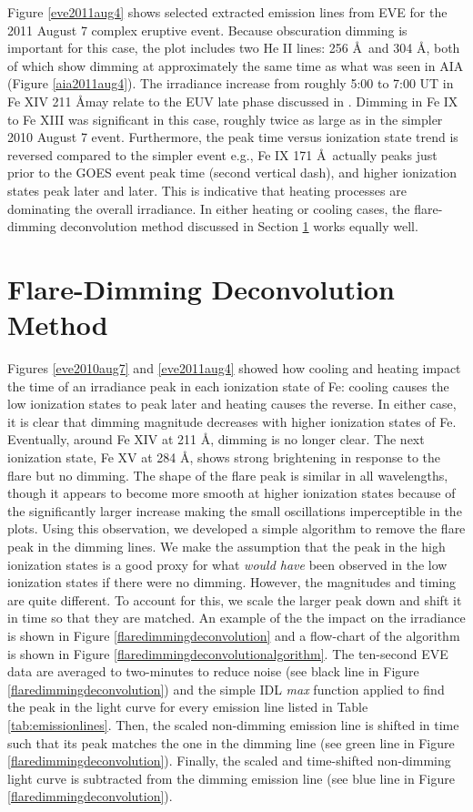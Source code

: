 Figure \ref{eve2011aug4} shows selected extracted emission lines from EVE for the 2011 August 7 complex eruptive event. Because obscuration dimming is important for this case, the plot includes two He II lines: 256 \AA\ and 304 \AA, both of which show dimming at approximately the same time as what was seen in AIA (Figure \ref{aia2011aug4}). The irradiance increase from roughly 5:00 to 7:00 UT in Fe XIV 211 \AA may relate to the EUV late phase discussed in \citet{Woods2011}. Dimming in Fe IX to Fe XIII was significant in this case, roughly twice as large as in the simpler 2010 August 7 event. Furthermore, the peak time versus ionization state trend is reversed compared to the simpler event e.g., Fe IX 171 \AA\ actually peaks just prior to the GOES event peak time (second vertical dash), and higher ionization states peak later and later. This is indicative that heating processes are dominating the overall irradiance. In either heating or cooling cases, the flare-dimming deconvolution method discussed in Section \ref{sec:deconvolve} works equally well. 

\section{Flare-Dimming Deconvolution Method}
\label{sec:deconvolve}
Figures \ref{eve2010aug7} and \ref{eve2011aug4} showed how cooling and heating impact the time of an irradiance peak in each ionization state of Fe: cooling causes the low ionization states to peak later and heating causes the reverse. In either case, it is clear that dimming magnitude decreases with higher ionization states of Fe. Eventually, around Fe XIV at 211 \AA, dimming is no longer clear. The next ionization state, Fe XV at 284 \AA, shows strong brightening in response to the flare but no dimming. The shape of the flare peak is similar in all wavelengths, though it appears to become more smooth at higher ionization states because of the significantly larger increase making the small oscillations imperceptible in the plots. Using this observation, we developed a simple algorithm to remove the flare peak in the dimming lines. We make the assumption that the peak in the high ionization states is a good proxy for what \textit{would have} been observed in the low ionization states if there were no dimming. However, the magnitudes and timing are quite different. To account for this, we scale the larger peak down and shift it in time so that they are matched. An example of the the impact on the irradiance is shown in Figure \ref{flaredimmingdeconvolution} and a flow-chart of the algorithm is shown in Figure \ref{flaredimmingdeconvolutionalgorithm}. The ten-second EVE data are averaged to two-minutes to reduce noise (see black line in Figure \ref{flaredimmingdeconvolution}) and the simple IDL \textit{max} function applied to find the peak in the light curve for every emission line listed in Table \ref{tab:emissionlines}. Then, the scaled non-dimming emission line is shifted in time such that its peak matches the one in the dimming line (see green line in Figure \ref{flaredimmingdeconvolution}). Finally, the scaled and time-shifted non-dimming light curve is subtracted from the dimming emission line (see blue line in Figure \ref{flaredimmingdeconvolution}). 

